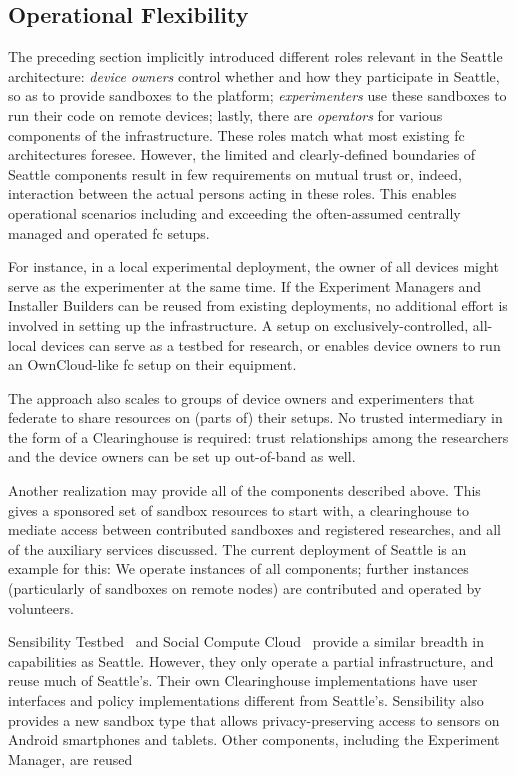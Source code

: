 \subsection{Operational Flexibility}

The preceding section implicitly introduced different roles relevant
in the Seattle architecture:
\textit{device owners} control whether and how they participate
in Seattle, so as to provide sandboxes to the platform;
\textit{experimenters} use these sandboxes to run their code
on remote devices;
lastly, there are \textit{operators} for various components
of the infrastructure.
These roles match what most existing \gls{fc} architectures
foresee.
However, the limited and clearly-defined boundaries of Seattle
components result in few requirements on mutual trust or, indeed,
interaction between
the actual persons acting in these roles. This enables operational
scenarios including and exceeding the often-assumed centrally managed
and operated \gls{fc} setups.

For instance, in a local experimental deployment, the owner of all
devices might serve as the experimenter at the same time. If
the Experiment Managers and Installer Builders can be reused
from existing deployments, no additional effort is involved in
setting up the infrastructure.
A setup on exclusively-controlled, all-local devices can serve as
a testbed for research, or enables device owners to run an
OwnCloud-like \gls{fc} setup on their equipment.

The approach also scales to groups of device owners and experimenters
that federate
to share resources on (parts of) their setups. No trusted
intermediary in the form of a Clearinghouse is required:
trust relationships among the researchers and the device owners
can be set up out-of-band as well.

Another realization may provide all of the components described above.
This gives a sponsored set of sandbox resources to start with,
a clearinghouse to mediate access between contributed sandboxes
and registered researches, and all of the auxiliary services
discussed. The current deployment of Seattle is an example for
this: We operate instances of all components; further instances
(particularly of sandboxes on remote nodes) are contributed and
operated by volunteers.

Sensibility Testbed~\cite{zhuang2014sensibility} and Social Compute
Cloud~\cite{caton2014social} provide a similar breadth in capabilities
as Seattle. However, they only operate a partial infrastructure, and
reuse much of Seattle's. Their own Clearinghouse
implementations have user interfaces and policy implementations
different from Seattle's. Sensibility also provides a new sandbox
type that allows privacy-preserving access to sensors on Android
smartphones and tablets. Other components, including the Experiment
Manager, are reused

